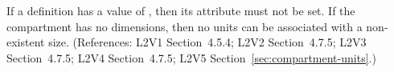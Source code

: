 If a \Compartment definition has a  value
of , then its  attribute must not be set. If the
compartment has no dimensions, then no units can be associated
with a non-existent size.  (References: L2V1 Section~4.5.4;
L2V2 Section~4.7.5; L2V3 Section~4.7.5; L2V4 Section~4.7.5; L2V5 Section~\ref{sec:compartment-units}.)
